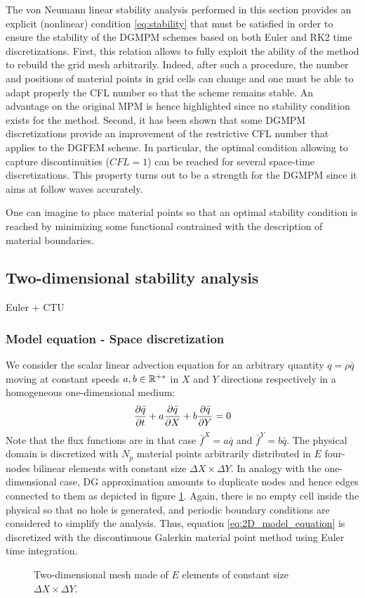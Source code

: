 The von Neumann linear stability analysis performed in this section provides an explicit (nonlinear) condition \eqref{eq:stability} that must be satisfied in order to ensure the stability of the DGMPM schemes based on both Euler and RK2 time discretizations. First, this relation allows to fully exploit the ability of the method to rebuild the grid mesh arbitrarily. Indeed, after such a procedure, the number and positions of material points in grid cells can change and one must be able to adapt properly the CFL number so that the scheme remains stable. An advantage on the original MPM is hence highlighted since no stability condition exists for the method. Second, it has been shown that some DGMPM discretizations provide an improvement of the restrictive CFL number that applies to the DGFEM scheme. In particular, the optimal condition allowing to capture discontinuities ($CFL=1$) can be reached for several space-time discretizations. This property turns out to be a strength for the DGMPM since it aims at follow waves accurately.

One can imagine to place material points so that an optimal stability condition is reached by minimizing some functional contrained with the description of material boundaries.

\subsection{Two-dimensional stability analysis}
Euler + CTU
\subsubsection*{Model equation - Space discretization}

We consider the scalar linear advection equation for an arbitrary quantity $q=\rho \bar{q}$ moving at constant speeds $a,b \in \mathbb{R}^{+*}$ in $X$ and $Y$ directions respectively in a homogeneous one-dimensional medium:
\begin{equation}
  \label{eq:2D_model_equation}
  \frac{\partial \bar{q}}{\partial t} + a\frac{\partial \bar{q}}{\partial X} + b\frac{\partial \bar{q}}{\partial Y}= 0
\end{equation}
Note that the flux functions are in that case $\bar{f}^X = a\bar{q}$ and $\bar{f}^Y = b\bar{q}$. The physical domain is discretized with $N_p$ material points arbitrarily distributed in $E$ four-nodes bilinear elements with constant size $\Delta X \times \Delta Y$. In analogy with the one-dimensional case, DG approximation amounts to duplicate nodes and hence edges connected to them as depicted in figure \ref{fig:2Dmesh}. Again, there is no empty cell inside the physical so that no hole is generated, and periodic boundary conditions are considered to simplify the analysis. Thus, equation \eqref{eq:2D_model_equation} is discretized with the discontinuous Galerkin material point method using Euler time integration.
\begin{figure}[h!]
  \centering
  
  \caption{Two-dimensional mesh made of $E$ elements of constant size $\Delta X \times \Delta Y$.}\label{fig:2Dmesh}
\end{figure}

